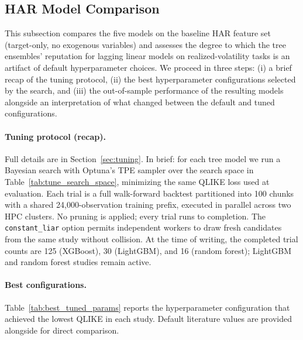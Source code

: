 \subsection{HAR Model Comparison}
\label{sec:results_model_comparison}

This subsection compares the five models on the baseline HAR feature set (target-only, no exogenous variables) and assesses the degree to which the tree ensembles' reputation for lagging linear models on realized-volatility tasks is an artifact of default hyperparameter choices. We proceed in three steps: (i) a brief recap of the tuning protocol, (ii) the best hyperparameter configurations selected by the search, and (iii) the out-of-sample performance of the resulting models alongside an interpretation of what changed between the default and tuned configurations.

\paragraph{Tuning protocol (recap).}
Full details are in Section~\ref{sec:tuning}. In brief: for each tree model we run a Bayesian search with Optuna's TPE sampler over the search space in Table~\ref{tab:tune_search_space}, minimizing the same QLIKE loss used at evaluation. Each trial is a full walk-forward backtest partitioned into 100 chunks with a shared 24{,}000-observation training prefix, executed in parallel across two HPC clusters. No pruning is applied; every trial runs to completion. The \texttt{constant\_liar} option permits independent workers to draw fresh candidates from the same study without collision. At the time of writing, the completed trial counts are 125 (XGBoost), 30 (LightGBM), and 16 (random forest); LightGBM and random forest studies remain active.

\paragraph{Best configurations.}
Table~\ref{tab:best_tuned_params} reports the hyperparameter configuration that achieved the lowest QLIKE in each study. Default literature values are provided alongside for direct comparison.

